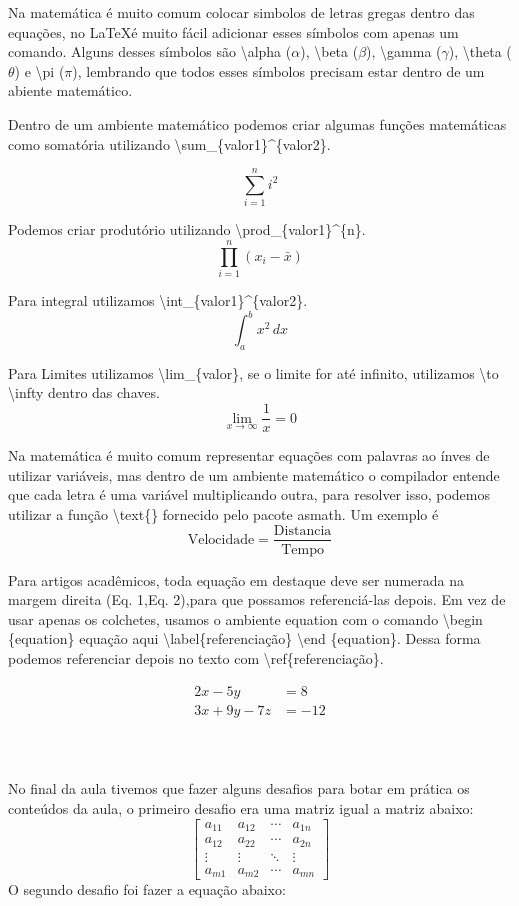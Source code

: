 Na matemática é muito comum colocar simbolos de letras gregas dentro das equações, no \LaTeX é muito fácil adicionar esses símbolos com apenas um comando. Alguns desses símbolos são \textbackslash alpha ($\alpha$), \textbackslash beta ($\beta$), \textbackslash gamma ($\gamma$), \textbackslash theta ($\theta$) e \textbackslash pi ($\pi$), lembrando que todos esses símbolos precisam estar dentro de um abiente matemático.

Dentro de um ambiente matemático podemos criar algumas funções matemáticas como somatória utilizando \textbackslash sum\_\{valor1\}\^{}\{valor2\}.

\[\sum_{i=1}^{n} i^2\]

Podemos criar produtório utilizando \textbackslash prod\_\{valor1\}\^{}\{n\}.
\[\prod_{i=1}^{n} (x_i- \bar{x})\]

Para integral utilizamos \textbackslash int\_\{valor1\}\^{}\{valor2\}.
\[\int_{a}^{b} x^2 \, dx\]

Para Limites utilizamos \textbackslash lim\_\{valor\}, se o limite for até infinito, utilizamos \textbackslash to \textbackslash infty dentro das chaves. 
\[\lim_{x \to \infty} \frac{1}{x} = 0\]

Na matemática é muito comum representar equações com palavras ao ínves de utilizar variáveis, mas dentro de um ambiente matemático o compilador entende que cada letra é uma variável multiplicando outra, para resolver isso, podemos utilizar a função \textbackslash text\{\} fornecido pelo pacote asmath. Um exemplo é 
\[\text{Velocidade} = \frac{\text{Distancia}}{\text{Tempo}}\]

Para artigos acadêmicos, toda equação em destaque deve ser numerada na margem direita (Eq. 1,Eq. 2),para que possamos referenciá-las depois. Em vez de usar apenas os colchetes, usamos o ambiente equation com o comando \textbackslash begin \{equation\} equação aqui \textbackslash label\{referenciação\} \textbackslash end \{equation\}. Dessa forma podemos referenciar depois no texto com \textbackslash ref\{referenciação\}.



\begin{align}
    2x - 5y &= 8 \\
    3x + 9y - 7z &= -12
\end{align}
\\
\\
\\

No final da aula tivemos que fazer alguns desafios para botar em prática os conteúdos da aula, o primeiro desafio era uma matriz igual a matriz abaixo: 
\[\begin{bmatrix}
    a_{11} &  a_{12} & \cdots & a_{1n}\\
    a_{12} & a_{22} & \cdots & a_{2n}\\
    \vdots & \vdots & \ddots & \vdots \\
    a_{m1} & a_{m2} & \cdots & a_{mn}
\end{bmatrix}\]
O segundo desafio foi fazer a equação abaixo:

